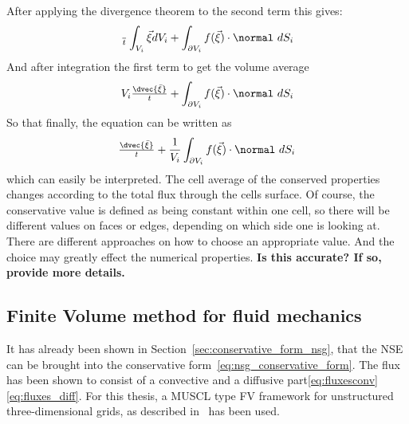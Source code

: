 \documentclass[../main.tex]{subfiles}
\begin{document}
After applying the divergence theorem to the second term this gives:
\begin{align}
\tfrac{~}{t}\int_{V_i} \vec{\xi} dV_i + \int_{\partial V_i} f(\vec{\xi})\cdot\normal~dS_i
\end{align}
And after integration the first term to get the volume average
\begin{align}
V_i \tfrac{\dvec{\bar{\xi}}}{t} + \int_{\partial V_i} f(\vec{\xi})\cdot\normal~dS_i
\end{align}
So that finally, the equation can be written as
\begin{align}
\tfrac{\dvec{\bar{\xi}}}{t} + \frac{1}{V_i} \int_{\partial V_i} f(\vec{\xi})\cdot\normal~dS_i
\end{align}
which can easily be interpreted. The cell average of the conserved properties changes according to the total flux through the cells surface.
Of course, the conservative value is defined as being constant within one cell, so there will be different values on faces or edges, depending on which side one is looking at. There are different approaches on how to choose an appropriate value. And the choice may greatly effect the numerical properties. \textbf{Is this accurate? If so, provide more details.}

\subsection{Finite Volume method for fluid mechanics}\label{sec:fv_fluid_mechanics}
It has already been shown in Section~\ref{sec:conservative_form_nsg}, that the \ac{NSE} can be brought into the conservative form~\eqref{eq:nsg_conservative_form}. The flux has been shown to consist of a convective and a diffusive part\eqref{eq:fluxesconv}\eqref{eq:fluxes_diff}.
For this thesis, a \ac{MUSCL} type \ac{FV} framework for unstructured three-dimensional grids, as described in~\cite{Main2014} has been used.
\end{document}
